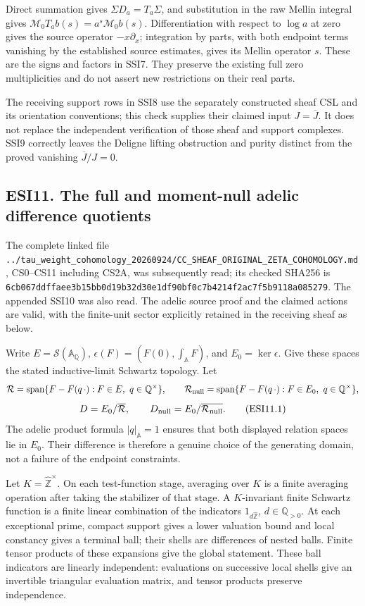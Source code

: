 Direct summation gives \(\Sigma D_a=T_a\Sigma\), and substitution in the
raw Mellin integral gives \(\mathcal M_0T_ab(s)=a^s\mathcal M_0b(s)\).
Differentiation with respect to \(\log a\) at zero gives the source
operator \(-x\partial_x\); integration by parts, with both endpoint
terms vanishing by the established source estimates, gives its Mellin
operator \(s\). These are the signs and factors in SSI7. They preserve
the existing full zero multiplicities and do not assert new restrictions
on their real parts.

The receiving support rows in SSI8 use the separately constructed sheaf
CSL and its orientation conventions; this check supplies their claimed
input \(J=\overline J\). It does not replace the independent
verification of those sheaf and support complexes. SSI9 correctly leaves
the Deligne lifting obstruction and purity distinct from the proved
vanishing \(\overline J/J=0\).

\subsection{ESI11. The full and moment-null adelic difference
quotients}\label{esi11.-the-full-and-moment-null-adelic-difference-quotients}

The complete linked file
\nolinkurl{../tau_weight_cohomology_20260924/CC_SHEAF_ORIGINAL_ZETA_COHOMOLOGY.md},
CS0--CS11 including CS2A, was subsequently read; its checked SHA256 is
\nolinkurl{6cb067ddffaee3b15bb0d19b32d30e1df90bf0c7b4214f2ac7f5b9118a085279}.
The appended SSI10 was also read. The adelic source proof and the
claimed actions are valid, with the finite-unit sector explicitly
retained in the receiving sheaf as below.

Write \(E=\mathcal S(\mathbb A_{\mathbb Q})\),
\(\epsilon(F)=(F(0),\int_{\mathbb A}F)\), and \(E_0=\ker\epsilon\). Give
these spaces the stated inductive-limit Schwartz topology. Let \[
\mathcal R=\operatorname{span}\{F-F(q\,\cdot):F\in E,\ q\in\mathbb Q^\times\},
\qquad
\mathcal R_{\rm null}=\operatorname{span}\{F-F(q\,\cdot):F\in E_0,\ q\in\mathbb Q^\times\},
\] \[
D=E_0/\overline{\mathcal R},\qquad
D_{\rm null}=E_0/\overline{\mathcal R_{\rm null}}.
\tag{ESI11.1}
\] The adelic product formula \(|q|_{\mathbb A}=1\) ensures that both
displayed relation spaces lie in \(E_0\). Their difference is therefore
a genuine choice of the generating domain, not a failure of the endpoint
constraints.

Let \(K=\widehat{\mathbb Z}^{\times}\). On each test-function stage,
averaging over \(K\) is a finite averaging operation after taking the
stabilizer of that stage. A \(K\)-invariant finite Schwartz function is
a finite linear combination of the indicators
\(1_{d\widehat{\mathbb Z}}\), \(d\in\mathbb Q_{>0}\). At each
exceptional prime, compact support gives a lower valuation bound and
local constancy gives a terminal ball; their shells are differences of
nested balls. Finite tensor products of these expansions give the global
statement. These ball indicators are linearly independent: evaluations
on successive local shells give an invertible triangular evaluation
matrix, and tensor products preserve independence.

